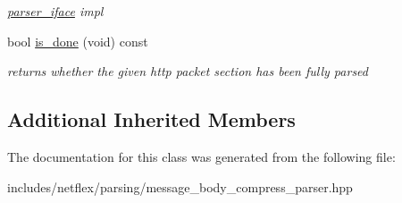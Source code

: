 \begin{DoxyCompactItemize}
\begin{DoxyCompactList}\small\item\em \hyperlink{classnetflex_1_1parsing_1_1parser__iface}{parser\+\_\+iface} impl \end{DoxyCompactList}\item 
\mbox{\label{classnetflex_1_1parsing_1_1message__body__compress__parser_ad963822a3d7ae17704fd7732925837f9}} 
bool \hyperlink{classnetflex_1_1parsing_1_1message__body__compress__parser_ad963822a3d7ae17704fd7732925837f9}{is\+\_\+done} (void) const
\begin{DoxyCompactList}\small\item\em returns whether the given http packet section has been fully parsed \end{DoxyCompactList}\end{DoxyCompactItemize}
\subsection*{Additional Inherited Members}


The documentation for this class was generated from the following file\+:\begin{DoxyCompactItemize}
\item 
includes/netflex/parsing/message\+\_\+body\+\_\+compress\+\_\+parser.\+hpp\end{DoxyCompactItemize}
